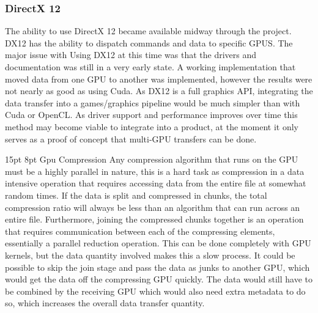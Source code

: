 \documentclass[12pt,a4paper]{article}
\makeatletter
\renewcommand\subsection{\@startsection {subsection}{1}{2mm} %
                               {15pt} %
                               {8pt} %
                               {\fontsize{13pt}{1em}\bfseries}}
\makeatother
\begin{document}
\subsubsection{DirectX 12}
The ability to use DirectX 12 became available midway through the project. DX12 has the ability to dispatch commands and data to specific GPUS. The major issue with Using DX12 at this time was that the drivers and documentation was still in a very early state. A working implementation that moved data from one GPU to another was implemented, however the results were not nearly as good as using Cuda. 
As DX12 is a full graphics API, integrating the data transfer into a games/graphics pipeline would be much simpler than with Cuda or OpenCL. As driver support and performance improves over time this method may become viable to integrate into a product, at the moment it only serves as a proof of concept that multi-GPU transfers can be done.


\subsection{Gpu Compression}
Any compression algorithm that runs on the GPU must be a highly parallel in nature, this is a hard task as compression in a data intensive operation that requires accessing data from the entire file at somewhat random times. If the data is split and compressed in chunks, the total compression ratio will always be less than an algorithm that can run across an entire file. Furthermore, joining the compressed chunks together is an operation that requires communication between each of the compressing elements, essentially a parallel reduction operation. This can be done completely with GPU kernels, but the data quantity involved makes this a slow process. It could be possible to skip the join stage and pass the data as junks to another GPU, which would get the data off the compressing GPU quickly. The data would still have to be combined by the receiving GPU which would also need extra metadata to do so, which increases the overall data transfer quantity. 
\end{document}

